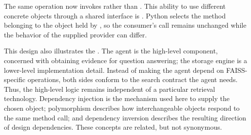 The same  operation now invokes  rather than . This ability to use different concrete objects through a shared interface is . Python selects the method belonging to the object held by , so the consumer's call remains unchanged while the behavior of the supplied provider can differ.

This design also illustrates the . The agent is the high-level component, concerned with obtaining evidence for question answering; the storage engine is a lower-level implementation detail. Instead of making the agent depend on FAISS-specific operations, both sides conform to the search contract the agent needs. Thus, the high-level logic remains independent of a particular retrieval technology. Dependency injection is the mechanism used here to supply the chosen object; polymorphism describes how interchangeable objects respond to the same method call; and dependency inversion describes the resulting direction of design dependencies. These concepts are related, but not synonymous.
